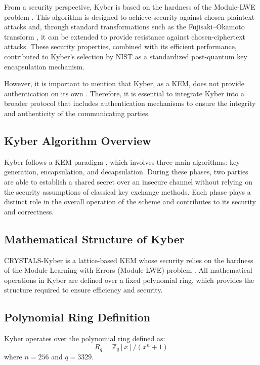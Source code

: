 \documentclass[12pt]{article}
\begin{document}
From a security perspective, Kyber is based on the hardness of the Module-LWE problem \cite{kyberspec}. This algorithm is designed to achieve security against chosen-plaintext attacks and, through standard transformations such as the Fujisaki–Okamoto transform \cite{fujisaki1999}, it can be extended to provide resistance against chosen-ciphertext attacks. These security properties, combined with its efficient performance, contributed to Kyber’s selection by NIST as a standardized post-quantum key encapsulation mechanism.

However, it is important to mention that Kyber, as a KEM, does not provide authentication on its own \cite{nist2024}. Therefore, it is essential to integrate Kyber into a broader protocol that includes authentication mechanisms to ensure the integrity and authenticity of the communicating parties.




\subsection{Kyber Algorithm Overview}

Kyber follows a KEM paradigm \cite{kyberspec}, which involves three main algorithms: key generation, encapsulation, and decapsulation. During these phases, two parties are able to establish a shared secret over an insecure channel without relying on the security assumptions of classical key exchange methods. Each phase plays a distinct role in the overall operation of the scheme and contributes to its security and correctness.


\subsection{Mathematical Structure of Kyber}

CRYSTALS-Kyber is a lattice-based KEM whose security relies on the hardness of the Module Learning with Errors (Module-LWE) problem \cite{kyberspec}. All mathematical operations in Kyber are defined over a fixed polynomial ring, which provides the structure required to ensure efficiency and security.

\subsection*{Polynomial Ring Definition}

Kyber operates over the polynomial ring defined as:
\begin{equation}
R_q = \mathbb{Z}_q[x] / (x^n + 1)
\end{equation}
where \( n = 256 \) and \( q = 3329 \). 
\end{document}
